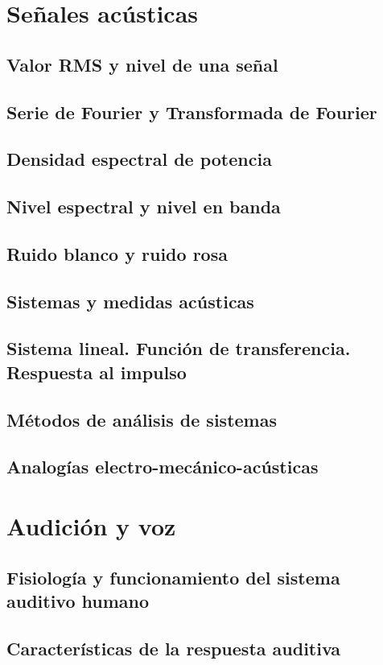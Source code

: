 \documentclass[a4paper]{book}
\begin{document}
\chapter{Señales acústicas}
\section{Valor RMS y nivel de una señal}
\section{Serie de Fourier y Transformada de Fourier}
\section{Densidad espectral de potencia}
\section{Nivel espectral y nivel en banda}
\section{Ruido blanco y ruido rosa}
\section{Sistemas y medidas acústicas}
\section{Sistema lineal. Función de transferencia. Respuesta al impulso}
\section{Métodos de análisis de sistemas}
\section{Analogías electro-mecánico-acústicas}

\chapter{Audición y voz}
\section{Fisiología y funcionamiento del sistema auditivo humano}
\section{Características de la respuesta auditiva}
\end{document}
